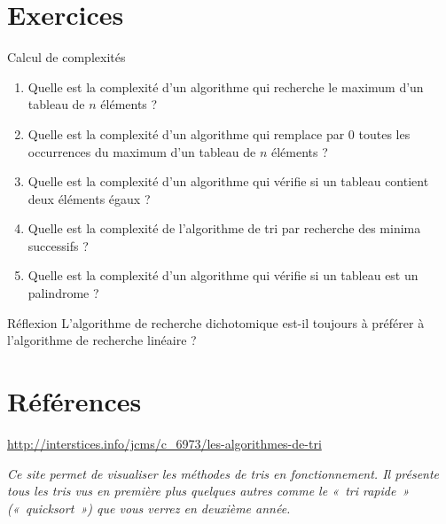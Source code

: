 \section{	Exercices}

	\begin{Exercice}{Calcul de complexités}
			
			\begin{enumerate}[label=\alph*)]
				\item 
					Quelle est la complexité d'un algorithme qui recherche
					le maximum d'un tableau de $n$ éléments ?
				\item 
					Quelle est la complexité d'un algorithme qui remplace
					par 0 toutes les occurrences du maximum d'un tableau
					de $n$ éléments ?
				\item 
					Quelle est la complexité d'un algorithme qui vérifie si
					un tableau contient deux éléments égaux ?
				\item 
					Quelle est la complexité de l'algorithme de tri par
					recherche des minima successifs ?
				\item 
					Quelle est la complexité d'un algorithme qui vérifie si
					un tableau est un palindrome ?
			\end{enumerate}
		\end{Exercice}
		
		\begin{Exercice}{Réflexion}
				L’algorithme de recherche dichotomique est-il toujours à préférer à
				l’algorithme de recherche linéaire ?
		\end{Exercice}


\section{Références}

	\liststyleListv
	\begin{liste}
		\item {
			\url{http://interstices.info/jcms/c_6973/les-algorithmes-de-tri}

			\textit{Ce site permet de visualiser les méthodes de tris en
			fonctionnement. Il présente tous les tris vus en première plus quelques
			autres comme le «~tri rapide~» («~quicksort~») que vous verrez en
			deuxième année. }}
	\end{liste}
